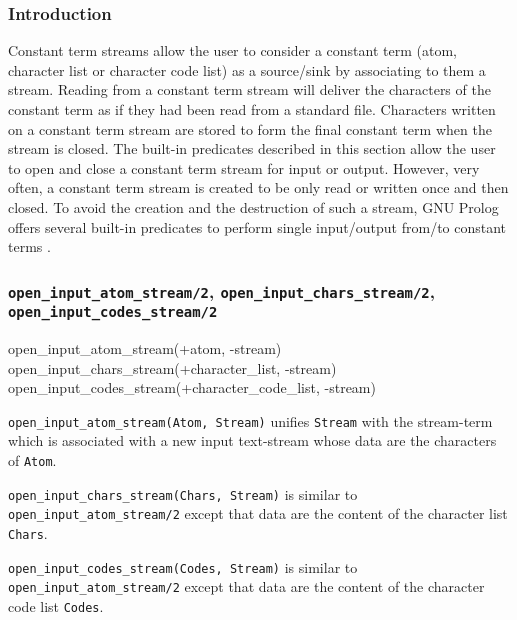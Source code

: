\subsubsection{Introduction}
\label{Introduction:(Constant-term-streams)}
Constant term streams allow the user to consider a constant term (atom,
character list or character code list) as a source/sink by associating to
them a stream. Reading from a constant term stream will deliver the
characters of the constant term as if they had been read from a standard
file. Characters written on a constant term stream are stored to form the
final constant term when the stream is closed. The built-in predicates
described in this section allow the user to open and close a constant term
stream for input or output. However, very often, a constant term stream is
created to be only read or written once and then closed. To avoid the
creation and the destruction of such a stream, GNU Prolog offers several
built-in predicates to perform single input/output from/to constant terms
.

\subsubsection{\texttt{open\_input\_atom\_stream/2},
               \texttt{open\_input\_chars\_stream/2}, \\
               \texttt{open\_input\_codes\_stream/2}}

\begin{TemplatesOneCol}
open\_input\_atom\_stream(+atom, -stream)\\
open\_input\_chars\_stream(+character\_list, -stream)\\
open\_input\_codes\_stream(+character\_code\_list, -stream)

\end{TemplatesOneCol}

\Description

\texttt{open\_input\_atom\_stream(Atom, Stream)} unifies \texttt{Stream}
with the stream-term which is associated with a new input text-stream whose
data are the characters of \texttt{Atom}.

\texttt{open\_input\_chars\_stream(Chars, Stream)} is similar to
\texttt{open\_input\_atom\_stream/2} except that data are the content of the
character list \texttt{Chars}.

\texttt{open\_input\_codes\_stream(Codes, Stream)} is similar to
\texttt{open\_input\_atom\_stream/2} except that data are the content of the
character code list \texttt{Codes}.

